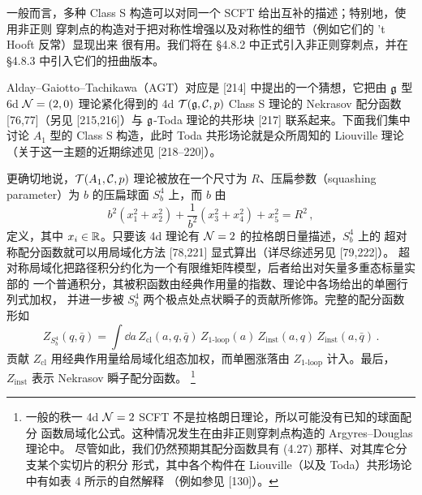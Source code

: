 

一般而言，多种 Class S 构造可以对同一个 SCFT 给出互补的描述；特别地，使用非正则
穿刺点的构造对于把对称性增强以及对称性的细节（例如它们的 't Hooft 反常）显现出来
很有用。我们将在 §4.8.2 中正式引入非正则穿刺点，并在 §4.8.3 中引入它们的扭曲版本。


Alday--Gaiotto--Tachikawa（AGT）对应是 [214] 中提出的一个猜想，它把由 $\mathfrak{g}$ 型
6d $\mathcal{N}=(2,0)$ 理论紧化得到的 4d $\mathcal{T}(\mathfrak{g},\mathcal{C},p)$ Class S 理论的 Nekrasov 配分函数
[76,77]（另见 [215,216]）与 $\mathfrak{g}$-Toda 理论的共形块 [217] 联系起来。下面我们集中
讨论 $A_1$ 型的 Class S 构造，此时 Toda 共形场论就是众所周知的 Liouville 理论
（关于这一主题的近期综述见 [218--220]）。

更确切地说，$\mathcal{T}(A_1,\mathcal{C},p)$ 理论被放在一个尺寸为 $R$、压扁参数（squashing
parameter）为 $b$ 的压扁球面 $S^4_b$ 上，而 $b$ 由
\begin{equation}
  b^2(x_1^2+x_2^2) + \frac{1}{b^2}(x_3^2+x_4^2) + x_5^2 = R^2\,,
  \tag{4.26}
\end{equation}
定义，其中 $x_i\in\mathbb{R}$。只要该 4d 理论有 $\mathcal{N}=2$ 的拉格朗日量描述，$S^4_b$ 上的
超对称配分函数就可以用局域化方法 [78,221] 显式算出（详尽综述另见 [79,222]）。
超对称局域化把路径积分约化为一个有限维矩阵模型，后者给出对矢量多重态标量实部的
一个普通积分，其被积函数由经典作用量的指数、理论中各场给出的单圈行列式加权，
并进一步被 $S^4_b$ 两个极点处点状瞬子的贡献所修饰。完整的配分函数形如
\begin{equation}
  Z_{S^4_b}(q,\bar q) = \int \dd a\,
  Z_{\mathrm{cl}}(a,q,\bar q)\, Z_{1\text{-loop}}(a)\,
  Z_{\mathrm{inst}}(a,q)\, Z_{\mathrm{inst}}(a,\bar q)\,.
  \tag{4.27}
\end{equation}
贡献 $Z_{\mathrm{cl}}$ 用经典作用量给局域化组态加权，而单圈涨落由
$Z_{1\text{-loop}}$ 计入。最后，$Z_{\mathrm{inst}}$ 表示 Nekrasov 瞬子配分函数。
\footnote{一般的秩一 4d $\mathcal{N}=2$ SCFT 不是拉格朗日理论，所以可能没有已知的球面配分
函数局域化公式。这种情况发生在由非正则穿刺点构造的 Argyres--Douglas 理论中。
尽管如此，我们仍然预期其配分函数具有 (4.27) 那样、对其库仑分支某个实切片的积分
形式，其中各个构件在 Liouville（以及 Toda）共形场论中有如表 4 所示的自然解释
（例如参见 [130]）。}


